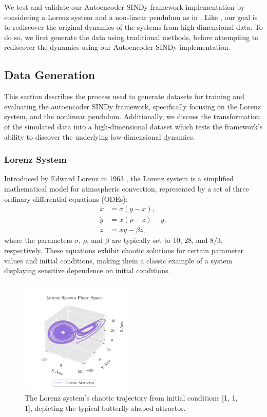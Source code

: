 We test and validate our Autoencoder SINDy framework implementation by considering a Lorenz system and a non-linear pendulum as in \textcite{Champion_2019}. Like \textcite{Champion_2019}, our goal is to rediscover the original dynamics of the systems from high-dimensional data. 
To do so, we first generate the data using traditional methods, before attempting to rediscover the dynamics using our Autoencoder SINDy implementation.


\subsection{Data Generation}

This section describes the process used to generate datasets for training and evaluating the autoencoder SINDy framework, specifically focusing on the Lorenz system, and the nonlinear pendulum. Additionally, we discuss the transformation of the simulated data into a high-dimensional dataset which tests the framework's ability to discover the underlying low-dimensional dynamics.


\subsubsection{Lorenz System}
Introduced by Edward Lorenz in 1963 \cite{lorenz1963deterministic}, the Lorenz system is a simplified mathematical model for atmospheric convection, represented by a set of three ordinary differential equations (ODEs):
\begin{equation}
\begin{aligned}
    \dot{x} &= \sigma (y - x), \\
    \dot{y} &= x (\rho - z) - y, \\
    \dot{z} &= x y - \beta z,
\end{aligned}
\label{eq:lorenz}
\end{equation}
where the parameters $\sigma$, $\rho$, and $\beta$ are typically set to 10, 28, and $8/3$, respectively. These equations exhibit chaotic solutions for certain parameter values and initial conditions, making them a classic example of a system displaying sensitive dependence on initial conditions.


\begin{figure}[!htbp]
    \centering
    \includegraphics[width=0.48\textwidth]{project_2/images/lorenz_static.pdf}
    \caption{The Lorenz system's chaotic trajectory from initial conditions [1, 1, 1], depicting the typical butterfly-shaped attractor.}
    \label{fig:lorenz}
\end{figure}

